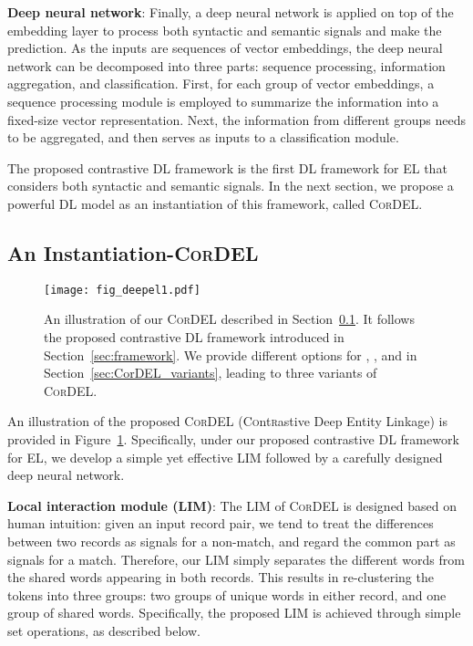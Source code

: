 \documentclass[conference]{IEEEtran}
\begin{document}
\textbf{Deep neural network}: Finally, a deep neural network is applied on top of the embedding layer to process both syntactic and semantic signals and make the prediction. As the inputs are sequences of vector embeddings, the deep neural network can be decomposed into three parts: sequence processing, information aggregation, and classification. First, for each group of vector embeddings, a sequence processing module is employed to summarize the information into a fixed-size vector representation. Next, the information from different groups needs to be aggregated, and then serves as inputs to a classification module.

The proposed contrastive DL framework is the first DL framework for EL that considers both syntactic and semantic signals. In the next section, we propose a powerful DL model as an instantiation of this framework, called \textsc{CorDEL}.


\subsection{An Instantiation-\textsc{CorDEL}}\label{sec:local_interact}


\begin{figure}
	\centering
	\texttt{[image: fig\_deepel1.pdf]}
	\caption{An illustration of our \textsc{CorDEL} described in Section~\ref{sec:local_interact}. It follows the proposed contrastive DL framework introduced in Section~\ref{sec:framework}. We provide different options for , , and  in Section~\ref{sec:CorDEL_variants}, leading to three variants of \textsc{CorDEL}.}
	\label{fig:CorDEL}
\end{figure}


An illustration of the proposed \textsc{CorDEL} (C\textsc{o}nt\textsc{r}astive Deep Entity Linkage) is provided in Figure~\ref{fig:CorDEL}. Specifically, under our proposed contrastive DL framework for EL, we develop a simple yet effective LIM followed by a carefully designed deep neural network.

\textbf{Local interaction module (LIM)}: The LIM of \textsc{CorDEL} is designed based on human intuition: given an input record pair, we tend to treat the differences between two records as signals for a non-match, and regard the common part as signals for a match. Therefore, our LIM simply separates the different words from the shared words appearing in both records. This results in re-clustering the tokens into three groups: two groups of unique words in either record, and one group of shared words. Specifically, the proposed LIM is achieved through simple set operations, as described below.
\end{document}
